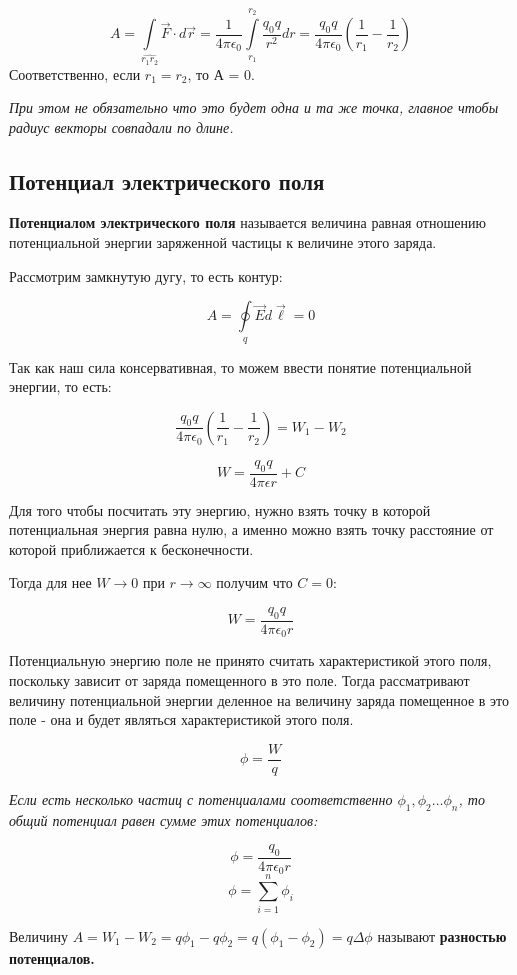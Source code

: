 \documentclass[../main.tex]{subfiles}
\begin{document}
\[ A = \int\limits_{\hat{r_1 r_2}} \vec{F} \cdot d\vec{r} = \frac{1}{4 \pi \epsilon_0} \int\limits_{r_1}^{r_2} \frac{q_0 q}{r^2}dr = \frac{q_0 q}{4 \pi \epsilon_0} \left(\frac{1}{r_1} - \frac{1}{r_2}\right) \]
Соответственно, если $r_1 = r_2$, то А = 0.

\textit{При этом не обязательно что это будет одна и та же точка, главное чтобы радиус векторы совпадали по длине.}

\subsection{Потенциал электрического поля}
 \textbf{Потенциалом электрического поля} называется величина равная отношению потенциальной энергии заряженной частицы к величине этого заряда.

Рассмотрим замкнутую дугу, то есть контур:

\[A = \oint\limits_q \vec{E} d\vec{\ell} = 0\]

Так как наш сила консервативная, то можем ввести понятие потенциальной энергии, то есть:

\[\frac{q_0 q}{4 \pi \epsilon_0} \left(\frac{1}{r_1} - \frac{1}{r_2}\right) = W_1 - W_2\]

\[W = \frac{q_0 q}{4 \pi \epsilon r} + C\]

Для того чтобы посчитать эту энергию, нужно взять точку в которой потенциальная энергия равна нулю, а именно можно взять точку расстояние от которой приближается к бесконечности.

\vspace{5px}

Тогда для нее $W \to 0$ при $r \to \infty$ получим что $C = 0$:

\[W = \frac{q_0 q}{4 \pi \epsilon_0 r}\]


Потенциальную энергию поле не принято считать характеристикой этого поля, поскольку зависит от заряда помещенного в это поле.
Тогда рассматривают величину потенциальной энергии деленное на величину заряда помещенное в это поле - она и будет являться характеристикой этого поля.


\[\phi = \frac{W}{q}\]

\textit{Если есть несколько частиц с потенциалами соответственно $\phi_1, \phi_2 \ldots \phi_n$, то общий потенциал равен сумме этих потенциалов:}

\[\phi = \frac{q_0}{4 \pi \epsilon_0 r} \]
\[\phi = \sum_{i = 1}^{n} \phi_i  \]

 Величину $A = W_1 - W_2 = q\phi_1 - q\phi_2 = q(\phi_1 - \phi_2) = q\Delta \phi$ называют \textbf{разностью потенциалов.}
\end{document}
